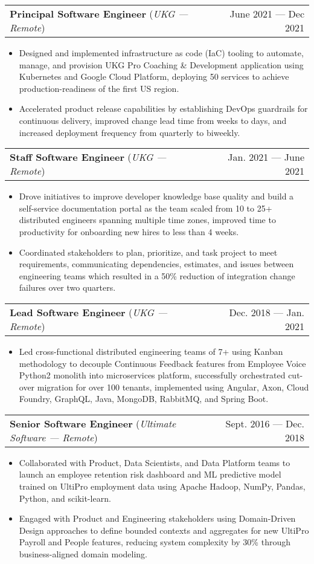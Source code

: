 \documentclass[letterpaper,10pt]{article}
\makeatletter
\newcommand{\experienceHeading}[4]{
  \item
    \begin{tabular*}{\textwidth}[t]{l@{\extracolsep{\fill}}r}
      \textbf{#1} (\textit{\small#3 --- \textit{\small #4}})& #2 \\
    \end{tabular*}\vspace{-4pt}
}
\newcommand{\experienceStart}{\begin{itemize}[leftmargin=16pt, rightmargin=8pt]}
\newcommand{\experienceEnd}{\end{itemize}\vspace{-7pt}}
\newcommand{\experience}[1]{\item\small{{#1 \vspace{-0.5pt}}}}
\makeatother
\begin{document}
  \experienceHeading{Principal Software Engineer}
    {June 2021 --- Dec 2021}
    {UKG}
    {Remote}
  \experienceStart{}
    \experience{
      Designed and implemented infrastructure as code (IaC) tooling to automate, manage, and provision UKG Pro Coaching \& Development application using Kubernetes and Google Cloud Platform, deploying 50 services to achieve production-readiness of the first US region.
    }
    \experience{
      Accelerated product release capabilities by establishing DevOps guardrails for continuous delivery, improved change lead time from weeks to days, and increased deployment frequency from quarterly to biweekly.
    }
  \experienceEnd{}

  \experienceHeading{Staff Software Engineer}
    {Jan. 2021 --- June 2021}
    {UKG}
    {Remote}
  \experienceStart{}
    \experience{
      Drove initiatives to improve developer knowledge base quality and build a self-service documentation portal as the team scaled from 10 to 25+ distributed engineers spanning multiple time zones, improved time to productivity for onboarding new hires to less than 4 weeks.
    }
    \experience{
      Coordinated stakeholders to plan, prioritize, and task project to meet requirements, communicating dependencies, estimates, and issues between engineering teams which resulted in a 50\% reduction of integration change failures over two quarters.
    }
  \experienceEnd{}

  \experienceHeading{Lead Software Engineer}
    {Dec. 2018 --- Jan. 2021}
    {UKG}
    {Remote}
  \experienceStart{}
    \experience{
      Led cross-functional distributed engineering teams of 7+ using Kanban methodology to decouple Continuous Feedback features from Employee Voice Python2 monolith into microservices platform, successfully orchestrated cut-over migration for over 100 tenants, implemented using Angular, Axon, Cloud Foundry, GraphQL, Java, MongoDB, RabbitMQ, and Spring Boot.
    }
  \experienceEnd{}

  \experienceHeading{Senior Software Engineer}
    {Sept. 2016 --- Dec. 2018}
    {Ultimate Software}
    {Remote}
  \experienceStart{}
    \experience{
      Collaborated with Product, Data Scientists, and Data Platform teams to launch an employee retention risk dashboard and ML predictive model trained on UltiPro employment data using Apache Hadoop, NumPy, Pandas, Python, and scikit-learn.
    }
    \experience{
      Engaged with Product and Engineering stakeholders using Domain-Driven Design approaches to define bounded contexts and aggregates for new UltiPro Payroll and People features, reducing system complexity by 30\% through business-aligned domain modeling.
    }
  \experienceEnd{}
\end{document}
